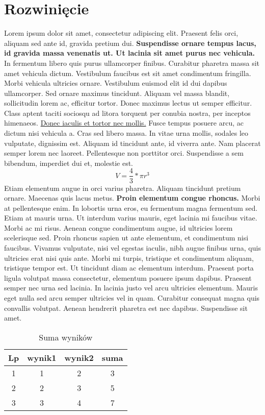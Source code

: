 \documentclass[12pt,a4paper]{article}
\begin{document}
	\section{Rozwinięcie}
	Lorem ipsum dolor sit amet, consectetur adipiscing elit. Praesent felis orci, aliquam sed ante id, gravida pretium dui. \textbf{Suspendisse ornare tempus lacus, id gravida massa venenatis ut. Ut lacinia sit amet purus nec vehicula.} In fermentum libero quis purus ullamcorper finibus. Curabitur pharetra massa sit amet vehicula dictum. Vestibulum faucibus est sit amet condimentum fringilla. Morbi vehicula ultricies ornare. Vestibulum euismod elit id dui dapibus ullamcorper. Sed ornare maximus tincidunt. Aliquam vel massa blandit, sollicitudin lorem ac, efficitur tortor. Donec maximus lectus ut semper efficitur. Class aptent taciti sociosqu ad litora torquent per conubia nostra, per inceptos himenaeos. \underline{Donec iaculis et tortor nec mollis.} Fusce tempus posuere arcu, ac dictum nisi vehicula a. Cras sed libero massa. In vitae urna mollis, sodales leo vulputate, dignissim est. Aliquam id tincidunt ante, id viverra ante. Nam placerat semper lorem nec laoreet. Pellentesque non porttitor orci. Suspendisse a sem bibendum, imperdiet dui et, molestie est.
    $$
        V=\frac{4}{3}*\pi r^3
    $$
    Etiam elementum augue in orci varius pharetra. Aliquam tincidunt pretium ornare. Maecenas quis lacus metus. \textbf{Proin elementum congue rhoncus.} Morbi at pellentesque enim. In lobortis urna eros, eu fermentum magna fermentum sed. Etiam at mauris urna. Ut interdum varius mauris, eget lacinia mi faucibus vitae. Morbi ac mi risus. Aenean congue condimentum augue, id ultricies lorem scelerisque sed. Proin rhoncus sapien ut ante elementum, et condimentum nisi faucibus.\cite{ref3} Vivamus vulputate, nisi vel egestas iaculis, nibh augue finibus urna, quis ultricies erat nisi quis ante. Morbi mi turpis, tristique et condimentum aliquam, tristique tempor est. Ut tincidunt diam ac elementum interdum. Praesent porta ligula volutpat massa consectetur, elementum posuere ipsum dapibus. Praesent semper nec urna sed lacinia. In lacinia justo vel arcu ultricies elementum. Mauris eget nulla sed arcu semper ultricies vel in quam. Curabitur consequat magna quis convallis volutpat. Aenean hendrerit pharetra est nec dapibus. Suspendisse sit amet. 
	\begin{table}[H]
		\centering
		\begin{tabular}{||c c c c||} 
			\hline
			Lp & wynik1 & wynik2 & suma \\ [0.5ex] 
			\hline\hline
			1 & 1 & 2 & 3 \\ 
			\hline
			2 & 2 & 3 & 5 \\
			\hline
			3 & 3 & 4 & 7 \\ [1ex] 
			\hline
		\end{tabular}
	\caption{Suma wyników}
	\label{table: Suma wyników}
	\end{table}
\end{document}

